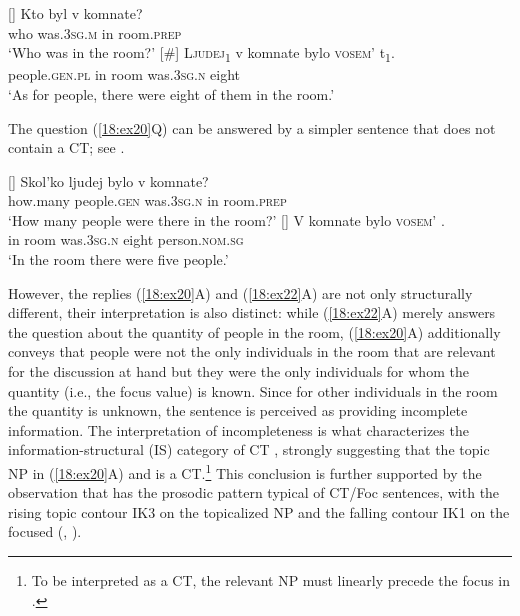 \documentclass[output=paper,modfonts,newtxmath,hidelinks]{langscibook}
\begin{document}
\begin{exe}
\ex \label{18:ex21}
\begin{xlist}
[]{
	\gll 
    	 Kto byl v komnate?\\
         who was.\textsc{3sg.m} in room.\textsc{prep}\\
	\glt `Who was in the room?'
    }
[\#]{
	\gll \textsc{Ljudej\textsubscript{1}}  v   komnate  bylo     \textsc{vosem’}   t\textsubscript{1}.\\
		 people.\textsc{gen.pl} in   room    was.\textsc{3sg.n}  eight  \\
    	\glt `As for people, there were eight of them in the room.'
        }
\end{xlist}
\end{exe}

\noindent The question (\ref{18:ex20}Q) can be answered by a simpler sentence that does not contain a CT; see .

\begin{exe}
\ex \label{18:ex22}
\begin{xlist}
[]{
	\gll 
    	 Skol’ko ljudej bylo v komnate?\\
         how.many people.\textsc{gen} was.\textsc{3sg.n} in room.\textsc{prep}\\
	\glt `How many people were there in the room?'
    }
[]{
	\gll V  komnate  bylo    \textsc{vosem’}    .\\
		 in  room    was.\textsc{3sg.n}  eight     person.\textsc{nom.sg}\\
    \glt `In the room there were five people.'     
    }
\end{xlist}
\end{exe}


\largerpage[2]
\noindent However, the replies (\ref{18:ex20}A) and (\ref{18:ex22}A) are not only structurally different, their interpretation is also distinct: while (\ref{18:ex22}A) merely answers the question about the quantity of people in the room, (\ref{18:ex20}A) additionally conveys that people were not the only individuals  in the room that are relevant for the discussion at hand but they were the only individuals for whom the quantity (i.e., the focus value) is known. Since for other individuals in the room the quantity is unknown, the sentence is perceived as providing incomplete information. The interpretation of incompleteness is what characterizes the information-structural (IS) category of CT \citep{Büring2003}, strongly suggesting that the topic NP in (\ref{18:ex20}A) and  is a CT.\footnote{\label{18:fn18}To be interpreted as a CT, the relevant NP must linearly precede the focus in  \citep{Titov2013}.} This conclusion is further supported by the observation that  has the prosodic pattern typical of CT/Foc sentences, with the rising topic contour IK3 on the topicalized NP and the falling contour IK1 on the focused  (\citealt{Bryzgunova1971, Bryzgunova1981}, \citealt{Titov2013}).
\end{document}
